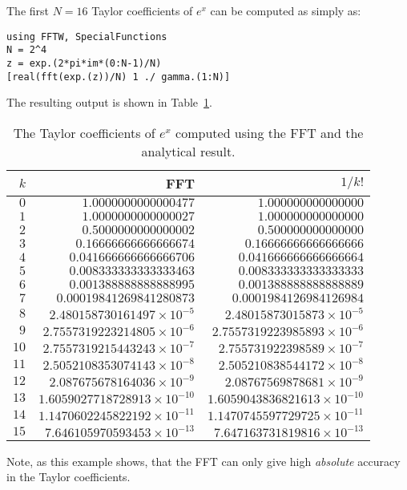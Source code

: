 \begin{example}
The first $N=16$ Taylor coefficients of $e^x$ can be computed as simply as:
\begin{verbatim}
using FFTW, SpecialFunctions
N = 2^4
z = exp.(2*pi*im*(0:N-1)/N)
[real(fft(exp.(z))/N) 1 ./ gamma.(1:N)]
\end{verbatim}
The resulting output is shown in Table~\ref{table:TaylorExponential}.
\begin{table}[htdp]
\caption{The Taylor coefficients of $e^x$ computed using the FFT and the analytical result.}
\begin{center}
\begin{tabular}{rrr}
\hline
$k$ & FFT & $1/k!$\\
\hline
$0$ & $1.0000000000000477$ & $1.000000000000000$\\
$1$ & $1.0000000000000027$ & $1.000000000000000$\\
$2$ & $0.5000000000000002$ & $0.500000000000000$\\
$3$ & $0.16666666666666674$ & $0.16666666666666666$\\
$4$ & $0.041666666666666706$ & $0.041666666666666664$\\
$5$ & $0.008333333333333463$ & $0.008333333333333333$\\
$6$ & $0.001388888888888995$ & $0.001388888888888889$\\
$7$ & $0.00019841269841280873$ & $0.0001984126984126984$\\
$8$ & $2.480158730161497\times10^{-5}$ & $2.48015873015873\times10^{-5}$\\
$9$ & $2.7557319223214805\times10^{-6}$ & $2.7557319223985893\times10^{-6}$\\
$10$ & $2.7557319215443243\times10^{-7}$ & $2.755731922398589\times10^{-7}$\\
$11$ & $2.5052108353074143\times10^{-8}$ & $2.505210838544172\times10^{-8}$\\
$12$ & $2.087675678164036\times10^{-9}$ & $2.08767569878681\times10^{-9}$\\
$13$ & $1.6059027718728913\times10^{-10}$ & $1.6059043836821613\times10^{-10}$\\
$14$ & $1.1470602245822192\times10^{-11}$ & $1.1470745597729725\times10^{-11}$\\
$15$ & $7.646105970593453\times10^{-13}$ & $7.647163731819816\times10^{-13}$\\
\hline
\end{tabular}
\end{center}
\label{table:TaylorExponential}
\end{table}%
Note, as this example shows, that the FFT can only give high {\em absolute} accuracy in the Taylor coefficients.
\end{example}

